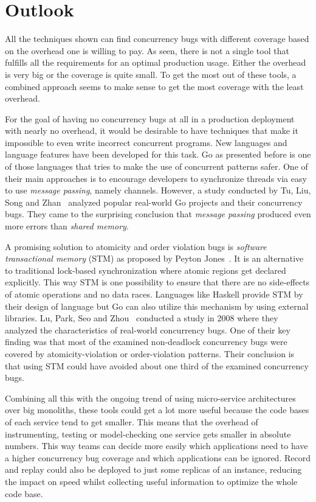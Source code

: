 \documentclass[conference]{IEEEtran}
\begin{document}
\section{Outlook}
\label{sct:outlook}

All the techniques shown can find concurrency bugs with different coverage based on the overhead one is willing to pay.
As seen, there is not a single tool that fulfills all the requirements for an optimal production usage.
Either the overhead is very big or the coverage is quite small.
To get the most out of these tools, a combined approach seems to make sense to get the most coverage with the least overhead.

For the goal of having no concurrency bugs at all in a production deployment with nearly no overhead, it would be desirable to have techniques that make it impossible to even write incorrect concurrent programs.
New languages and language features have been developed for this task.
Go as presented before is one of those languages that tries to make the use of concurrent patterns safer.
One of their main approaches is to encourage developers to synchronize threads via easy to use \emph{message passing}, namely channels.
However, a study conducted by Tu, Liu, Song and Zhan~\cite{tu2019go} analyzed popular real-world Go projects and their concurrency bugs.
They came to the surprising conclusion that \emph{message passing} produced even more errors than \emph{shared memory}.

A promising solution to atomicity and order violation bugs is \emph{software transactional memory} (STM) as proposed by Peyton Jones~\cite{peytonjones2007beautiful}.
It is an alternative to traditional lock-based synchronization where atomic regions get declared explicitly.
This way STM is one possibility to ensure that there are no side-effects of atomic operations and no data races.
Languages like Haskell provide STM by their design of language but Go can also utilize this mechanism by using external libraries.
Lu, Park, Seo and Zhou~\cite{lu2008mistakes} conducted a study in 2008 where they analyzed the characteristics of real-world concurrency bugs.
One of their key finding was that most of the examined non-deadlock concurrency bugs were covered by atomicity-violation or order-violation patterns.
Their conclusion is that using STM could have avoided about one third of the examined concurrency bugs.

Combining all this with the ongoing trend of using micro-service architectures over big monoliths, these tools could get a lot more useful because the code bases of each service tend to get smaller.
This means that the overhead of instrumenting, testing or model-checking one service gets smaller in absolute numbers.
This way teams can decide more easily which applications need to have a higher concurrency bug coverage and which applications can be ignored.
Record and replay could also be deployed to just some replicas of an instance, reducing the impact on speed whilst collecting useful information to optimize the whole code base.
\end{document}
